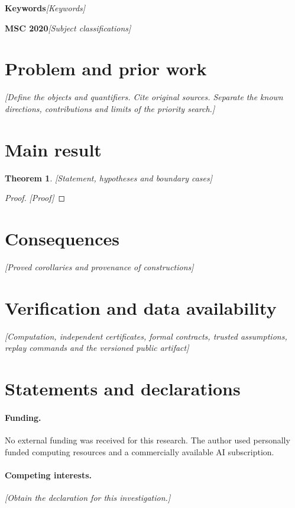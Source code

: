 \documentclass[11pt]{article}
\title{\DraftField{Title}}
\author{Troy Valiyaparampil\\{\small Independent researcher}}
\date{\DraftField{Publication date and version}}
\newtheorem{theorem}{Theorem}[section]
\newcommand{\DraftField}[1]{\textit{[#1]}}
\begin{document}
\maketitle
\begin{abstract}
\DraftField{State the precise result, assumptions, proof idea and significance.}
\end{abstract}
\noindent\textbf{Keywords}\quad \DraftField{Keywords}\par
\noindent\textbf{MSC 2020}\quad \DraftField{Subject classifications}

\section{Problem and prior work}
\DraftField{Define the objects and quantifiers. Cite original sources. Separate the known directions, contributions and limits of the priority search.}
\section{Main result}
\begin{theorem}
\DraftField{Statement, hypotheses and boundary cases}
\end{theorem}
\begin{proof}
\DraftField{Proof}
\end{proof}
\section{Consequences}
\DraftField{Proved corollaries and provenance of constructions}
\section{Verification and data availability}
\DraftField{Computation, independent certificates, formal contracts, trusted assumptions, replay commands and the versioned public artifact}
\section*{Statements and declarations}
\paragraph{Funding.} No external funding was received for this research. The author used personally funded computing resources and a commercially available AI subscription.
\paragraph{Competing interests.} \DraftField{Obtain the declaration for this investigation.}
\end{document}

